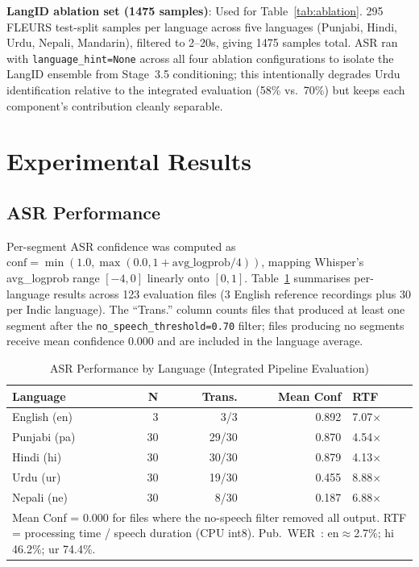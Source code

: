 \documentclass[conference]{IEEEtran}
\begin{document}
\textbf{LangID ablation set (1475 samples)}: Used for Table~\ref{tab:ablation}. 295 FLEURS test-split samples per language across five languages (Punjabi, Hindi, Urdu, Nepali, Mandarin), filtered to 2--20s, giving 1475 samples total. ASR ran with \texttt{language\_hint=None} across all four ablation configurations to isolate the LangID ensemble from Stage~3.5 conditioning; this intentionally degrades Urdu identification relative to the integrated evaluation (58\% vs.\ 70\%) but keeps each component's contribution cleanly separable.

\section{Experimental Results}

\subsection{ASR Performance}
\label{sec:asr}

Per-segment ASR confidence was computed as $\text{conf} = \min(1.0, \max(0.0, 1 + \text{avg\_logprob}/4))$, mapping Whisper's avg\_logprob range $[-4, 0]$ linearly onto $[0, 1]$. Table~\ref{tab:asr} summarises per-language results across 123 evaluation files (3 English reference recordings plus 30 per Indic language). The ``Trans.'' column counts files that produced at least one segment after the \texttt{no\_speech\_threshold=0.70} filter; files producing no segments receive mean confidence 0.000 and are included in the language average.

\begin{table}[htbp]
\caption{ASR Performance by Language (Integrated Pipeline Evaluation)}
\label{tab:asr}
\begin{center}
\begin{tabular}{lrrrl}
\toprule
\textbf{Language} & \textbf{N} & \textbf{Trans.} & \textbf{Mean Conf} & \textbf{RTF} \\
\midrule
English (en) & 3  & 3/3   & 0.892 & 7.07$\times$ \\
Punjabi (pa) & 30 & 29/30 & 0.870 & 4.54$\times$ \\
Hindi (hi)   & 30 & 30/30 & 0.879 & 4.13$\times$ \\
Urdu (ur)    & 30 & 19/30 & 0.455 & 8.88$\times$ \\
Nepali (ne)  & 30 & 8/30  & 0.187 & 6.88$\times$ \\
\midrule
\multicolumn{5}{p{7.5cm}}{\footnotesize Mean Conf = 0.000 for files where the no-speech filter removed all output. RTF = processing time / speech duration (CPU int8). Pub.\ WER~\cite{radford2022whisper}: en$\approx$2.7\%; hi 46.2\%; ur 74.4\%.} \\
\bottomrule
\end{tabular}
\end{center}
\end{table}
\end{document}
